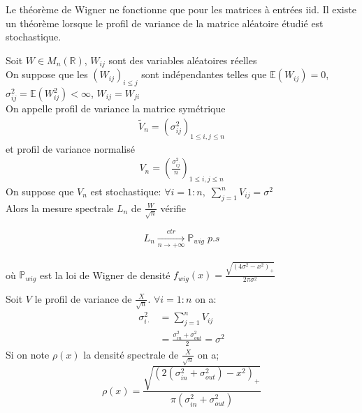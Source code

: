 Le théorème de Wigner ne fonctionne que pour les matrices à entrées iid. 
Il existe un théorème lorsque le profil de variance de la matrice aléatoire étudié est stochastique.
\begin{theorem}\label{th:1}
Soit $W \in M_{n}(\mathbb{R})$, $W_{ij}$ sont des variables aléatoires réelles\\
On suppose que les $(W_{ij})_{i \leq j}$ sont indépendantes telles que $\mathbb{E}(W_{ij}) = 0$, $\sigma_{ij}^2 = \mathbb{E}(W_{ij}^2) < \infty$, $W_{ij} = W_{ji}$\\
On appelle profil de variance la matrice symétrique
\begin{align*}
	\tilde V_n = (\sigma_{ij}^2)_{1 \leq i,j \leq n}
\end{align*}
et profil de variance normalisé 
\begin{align*}
	V_n = \left(\frac{\sigma_{ij}^2}{n}\right)_{1 \leq i,j \leq n}
\end{align*}
On suppose que $V_n$ est stochastique: $\forall i = 1:n , \; \sum_{j=1}^{n}V_{ij} = \sigma^2$\\
Alors la mesure spectrale $L_{n}$ de $\frac{W}{\sqrt{n}}$ vérifie

\begin{equation}
	L_n\xrightarrow[n \to +\infty]{etr} \mathbb{P}_{wig}\nonumber \; p.s
\end{equation}\\
où $\mathbb{P}_{wig}$ est la loi de Wigner de densité $f_{wig}(x)= \frac{\sqrt{(4\sigma^2 - x^2)_+}}{2\pi\sigma^2}$
\end{theorem}

Soit $V$ le profil de variance de $\frac{X}{\sqrt{n}}$. $\forall i = 1:n$ on a: 
\begin{align*} 
\sigma_{i \cdot}^2 &= \sum_{j=1}^{n}V_{ij}  \\
 		&= \boxed{\frac{\sigma_{in}^2 + \sigma_{out}^2}{2} = \sigma^2}
\end{align*}
Si on note $\rho(x)$ la densité spectrale de $\frac{X}{\sqrt{n}}$ on a;
\begin{equation}
	\rho(x) = \frac{\sqrt{(2(\sigma_{in}^2 + \sigma_{out}^2) - x^2)_+}}{\pi(\sigma_{in}^2 + \sigma_{out}^2)}
\end{equation}


